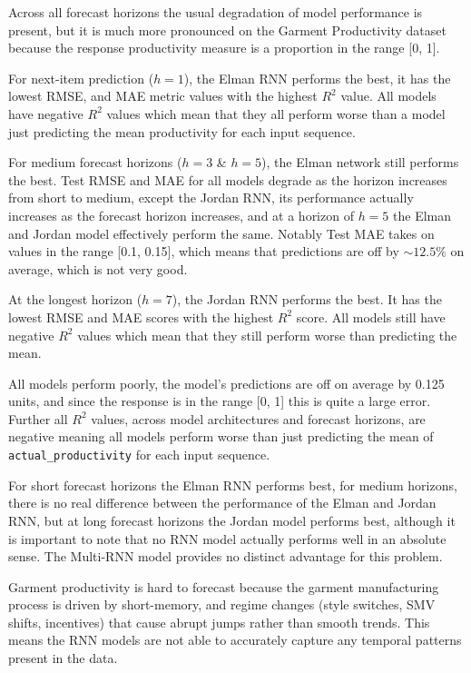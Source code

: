 \documentclass[conference]{IEEEtran}
\begin{document}
Across all forecast horizons the usual degradation of model performance is present, but it is much more pronounced on the Garment Productivity dataset because the response productivity measure is a proportion in the range [0, 1].

For next-item prediction ($h=1$), the Elman RNN performs the best, it has the lowest RMSE, and MAE metric values with the highest $R^2$ value. All models have negative $R^2$ values which mean that they all perform worse than a model just predicting the mean productivity for each input sequence.

For medium forecast horizons ($h=3$ \& $h=5$), the Elman network still performs the best. Test RMSE and MAE for all models degrade as the horizon increases from short to medium, except the Jordan RNN, its performance actually increases as the forecast horizon increases, and at a horizon of $h=5$ the Elman and Jordan model effectively perform the same. Notably Test MAE takes on values in the range [0.1, 0.15], which means that predictions are off by $\sim 12.5\%$ on average, which is not very good.

At the longest horizon ($h=7$), the Jordan RNN performs the best. It has the lowest RMSE and MAE scores with the highest $R^2$ score. All models still have negative $R^2$ values which mean that they still perform worse than predicting the mean.

All models perform poorly, the model's predictions are off on average by 0.125 units, and since the response is in the range [0, 1] this is quite a large error. Further all $R^2$ values, across model architectures and forecast horizons, are negative meaning all models perform worse than just predicting the mean of \texttt{actual\_productivity} for each input sequence.

For short forecast horizons the Elman RNN performs best, for medium horizons, there is no real difference between the performance of the Elman and Jordan RNN, but at long forecast horizons the Jordan model performs best, although it is important to note that no RNN model actually performs well in an absolute sense. The Multi-RNN model provides no distinct advantage for this problem.

Garment productivity is hard to forecast because the garment manufacturing process is driven by short-memory, and regime changes (style switches, SMV shifts, incentives) that cause abrupt jumps rather than smooth trends. This means the RNN models are not able to accurately capture any temporal patterns present in the data.
\end{document}
